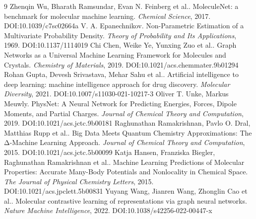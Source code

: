 \documentclass[11pt]{article}
\begin{document}
\begin{thebibliography}{9}
 Zhenqin Wu, Bharath Ramsundar, Evan N. Feinberg et al.. MoleculeNet: a benchmark for molecular machine learning. \emph{Chemical Science}, 2017. DOI:10.1039/c7sc02664a
 V. A. Epanechnikov. Non-Parametric Estimation of a Multivariate Probability Density. \emph{Theory of Probability and Its Applications}, 1969. DOI:10.1137/1114019
 Chi Chen, Weike Ye, Yunxing Zuo et al.. Graph Networks as a Universal Machine Learning Framework for Molecules and Crystals. \emph{Chemistry of Materials}, 2019. DOI:10.1021/acs.chemmater.9b01294
 Rohan Gupta, Devesh Srivastava, Mehar Sahu et al.. Artificial intelligence to deep learning: machine intelligence approach for drug discovery. \emph{Molecular Diversity}, 2021. DOI:10.1007/s11030-021-10217-3
 Oliver T. Unke, Markus Meuwly. PhysNet: A Neural Network for Predicting Energies, Forces, Dipole Moments, and Partial Charges. \emph{Journal of Chemical Theory and Computation}, 2019. DOI:10.1021/acs.jctc.9b00181
 Raghunathan Ramakrishnan, Pavlo O. Dral, Matthias Rupp et al.. Big Data Meets Quantum Chemistry Approximations: The Δ-Machine Learning Approach. \emph{Journal of Chemical Theory and Computation}, 2015. DOI:10.1021/acs.jctc.5b00099
 Katja Hansen, Franziska Biegler, Raghunathan Ramakrishnan et al.. Machine Learning Predictions of Molecular Properties: Accurate Many-Body Potentials and Nonlocality in Chemical Space. \emph{The Journal of Physical Chemistry Letters}, 2015. DOI:10.1021/acs.jpclett.5b00831
 Yuyang Wang, Jianren Wang, Zhonglin Cao et al.. Molecular contrastive learning of representations via graph neural networks. \emph{Nature Machine Intelligence}, 2022. DOI:10.1038/s42256-022-00447-x
\end{thebibliography}
\end{document}
